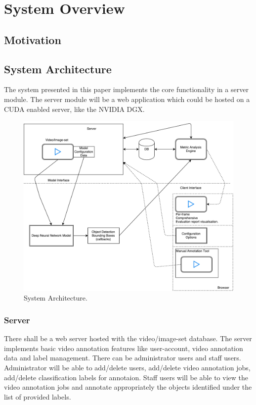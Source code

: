 \documentclass[conference]{IEEEtran}
\newcommand{\figwidthb}{0.80\linewidth}
\begin{document}
\section{System Overview}\label{sec.overview}

\subsection{Motivation}

\subsection{System Architecture}
The system presented in this paper implements the core functionality in a server module. The server module will be a web application which could be hosted on a CUDA enabled server, like the NVIDIA DGX.

\begin{figure}[htb]
\centering
\includegraphics[width=\figwidthb]{fig/system_architecture.pdf}
\caption{System Architecture.} \label{fig.structure}
\end{figure}

\subsubsection{Server}
There shall be a web server hosted with the video/image-set database. The server implements basic video annotation features like user-account, video annotation data and label management. There can be administrator users and staff users. Administrator will be able to add/delete users, add/delete video annotation jobs, add/delete classification labels for annotaion. Staff users will be able to view the video annotation jobs and annotate appropriately the objects identified under the list of provided labels.
\end{document}
